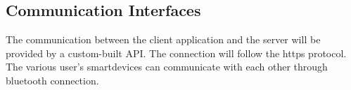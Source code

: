 \subsection{Communication Interfaces}
The communication between the client application and the server will be provided by a custom-built API.
The connection will follow the https protocol. The various user’s smartdevices can communicate with each other through bluetooth connection.
